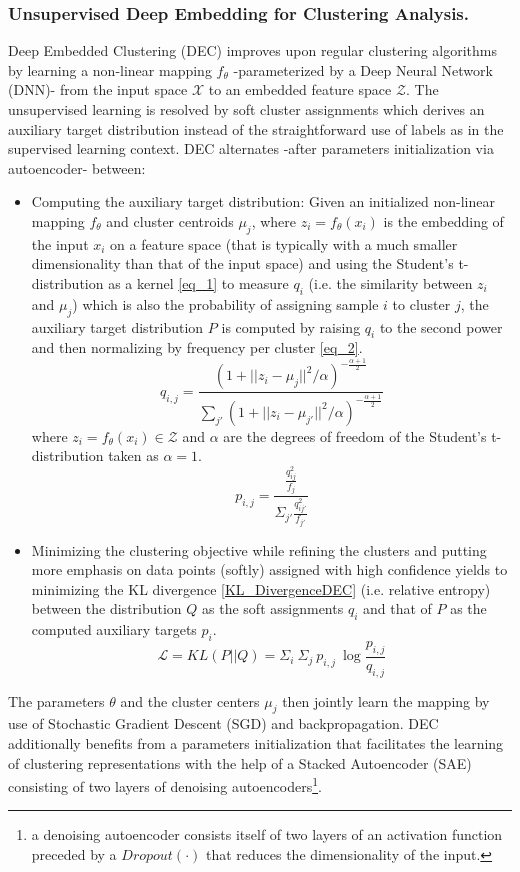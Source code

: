 \documentclass[runningheads]{llncs}
\begin{document}
\subsubsection{Unsupervised Deep Embedding for Clustering Analysis.}
Deep Embedded Clustering (DEC) \cite{7} improves upon regular clustering algorithms by learning a non-linear mapping $f_\theta$ -parameterized by a Deep Neural Network (DNN)- from the input space $\mathcal{X}$ to an embedded feature space $\mathcal{Z}$. The unsupervised learning is resolved by soft cluster assignments which derives an auxiliary target distribution instead of the straightforward use of labels as in the supervised learning context. DEC alternates -after parameters initialization via autoencoder- between:
\begin{itemize}
  \item Computing the auxiliary target distribution: Given an initialized non-linear mapping $f_\theta$ and cluster centroids $\mu_j$, where $z_i = f_\theta(x_i)$ is the embedding of the input $x_i$ on a feature space (that is typically with a much smaller dimensionality than that of the input space) and using the Student's t-distribution as a kernel \eqref{eq_1} to measure $q_i$ (i.e. the similarity between ${z}_i$ and $\mu_j$) which is also the probability of assigning sample $i$ to cluster $j$, the auxiliary target distribution $P$ is computed by raising $q_i$ to the second power and then normalizing by frequency per cluster \eqref{eq_2}.
\begin{equation}
q_{i,j} = \frac{(1 + ||z_i - \mu_j||^2/\alpha)^{-\frac{\alpha+1}{2}}}{\sum_{j'}(1 + ||z_i - \mu_{j'}||^2/\alpha)^{-\frac{\alpha+1}{2}}} 
\label{eq_1}
\end{equation}
where $z_i = f_\theta(x_i) \in \mathcal{Z}$ and $\alpha$ are the degrees of freedom of the Student's t-distribution taken as $\alpha=1$.
\begin{equation}
p_{i,j} = \frac{\frac{q^2_{i j}}{f_j}}{\Sigma_{j'} \frac{q^2_{ij'}}{f_{j'}}}
\label{eq_2}
\end{equation}
  \item Minimizing the clustering objective while refining the clusters and putting more emphasis on data points (softly) assigned with high confidence yields to minimizing the KL divergence \eqref{KL_DivergenceDEC} (i.e. relative entropy) between the distribution $Q$ as the soft assignments $q_i$ and that of $P$ as the computed auxiliary targets $p_i$.
\begin{equation}
\mathcal{L} = KL(P||Q) = \Sigma_i\ \Sigma_j\ p_{i,j}\ \log\frac{p_{i,j}}{q_{i,j}}
\label{KL_DivergenceDEC}
\end{equation}
\end{itemize}
The parameters $\theta$ and the cluster centers $\mu_j$ then jointly learn the mapping by use of Stochastic Gradient Descent (SGD) and backpropagation. DEC additionally benefits from a parameters initialization that facilitates the learning of clustering representations with the help of a Stacked Autoencoder (SAE) consisting of two layers of denoising autoencoders\footnote{a denoising autoencoder consists itself of two layers of an activation function preceded by a $Dropout(\cdot)$ that reduces the dimensionality of the input.}.
\end{document}
